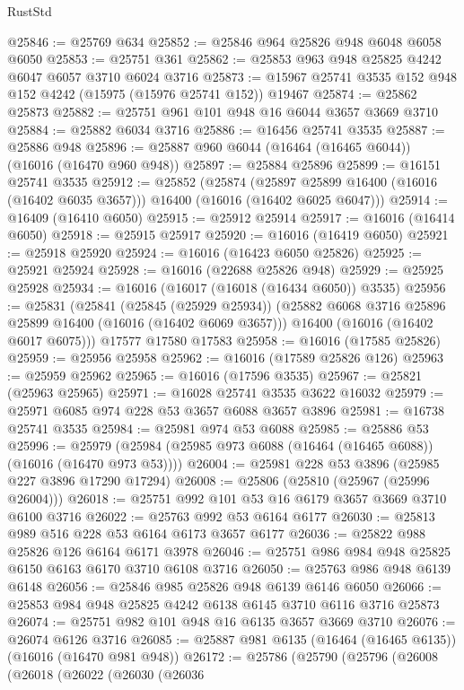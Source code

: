 \begin{lexlean}{RustStd}
\begin{coremodule}
@25846 := @25769 @634
@25852 := @25846 @964 @25826 @948 @6048 @6058 @6050
@25853 := @25751 @361
@25862 := @25853 @963 @948 @25825 @4242 @6047 @6057 @3710 @6024 @3716
@25873 := @15967 @25741 @3535 @152 @948 @152 @4242 (@15975 (@15976 @25741 @152)) @19467
@25874 := @25862 @25873
@25882 := @25751 @961 @101 @948 @16 @6044 @3657 @3669 @3710
@25884 := @25882 @6034 @3716
@25886 := @16456 @25741 @3535
@25887 := @25886 @948
@25896 := @25887 @960 @6044 (@16464 (@16465 @6044)) (@16016 (@16470 @960 @948))
@25897 := @25884 @25896
@25899 := @16151 @25741 @3535
@25912 := @25852
    (@25874
      (@25897 @25899 @16400 (@16016 (@16402 @6035 @3657)))
      @16400
      (@16016 (@16402 @6025 @6047)))
@25914 := @16409 (@16410 @6050)
@25915 := @25912 @25914
@25917 := @16016 (@16414 @6050)
@25918 := @25915 @25917
@25920 := @16016 (@16419 @6050)
@25921 := @25918 @25920
@25924 := @16016 (@16423 @6050 @25826)
@25925 := @25921 @25924
@25928 := @16016 (@22688 @25826 @948)
@25929 := @25925 @25928
@25934 := @16016 (@16017 (@16018 (@16434 @6050)) @3535)
@25956 := @25831
    (@25841
      (@25845 (@25929 @25934))
      (@25882 @6068 @3716 @25896 @25899 @16400 (@16016 (@16402 @6069 @3657)))
      @16400
      (@16016 (@16402 @6017 @6075)))
    @17577
    @17580
    @17583
@25958 := @16016 (@17585 @25826)
@25959 := @25956 @25958
@25962 := @16016 (@17589 @25826 @126)
@25963 := @25959 @25962
@25965 := @16016 (@17596 @3535)
@25967 := @25821 (@25963 @25965)
@25971 := @16028 @25741 @3535 @3622 @16032
@25979 := @25971 @6085 @974 @228 @53 @3657 @6088 @3657 @3896
@25981 := @16738 @25741 @3535
@25984 := @25981 @974 @53 @6088
@25985 := @25886 @53
@25996 := @25979 (@25984 (@25985 @973 @6088 (@16464 (@16465 @6088)) (@16016 (@16470 @973 @53))))
@26004 := @25981 @228 @53 @3896 (@25985 @227 @3896 @17290 @17294)
@26008 := @25806 (@25810 (@25967 (@25996 @26004)))
@26018 := @25751 @992 @101 @53 @16 @6179 @3657 @3669 @3710 @6100 @3716
@26022 := @25763 @992 @53 @6164 @6177
@26030 := @25813 @989 @516 @228 @53 @6164 @6173 @3657 @6177
@26036 := @25822 @988 @25826 @126 @6164 @6171 @3978
@26046 := @25751 @986 @984 @948 @25825 @6150 @6163 @6170 @3710 @6108 @3716
@26050 := @25763 @986 @948 @6139 @6148
@26056 := @25846 @985 @25826 @948 @6139 @6146 @6050
@26066 := @25853 @984 @948 @25825 @4242 @6138 @6145 @3710 @6116 @3716 @25873
@26074 := @25751 @982 @101 @948 @16 @6135 @3657 @3669 @3710
@26076 := @26074 @6126 @3716
@26085 := @25887 @981 @6135 (@16464 (@16465 @6135)) (@16016 (@16470 @981 @948))
@26172 := @25786
    (@25790
      (@25796
        (@26008
          (@26018
            (@26022
              (@26030
                (@26036

\end{coremodule}
\end{lexlean}
